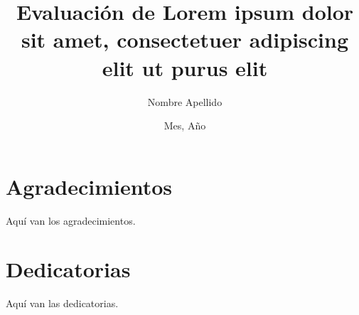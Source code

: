 \documentclass{plantillaucsd}
\title{Evaluación de Lorem ipsum dolor sit amet, consectetuer adipiscing elit ut purus elit}
\author{Nombre Apellido} %
\date{Mes, Año} %
\begin{document}
\titlepage{}

\chapter*{Agradecimientos}
\thispagestyle{empty}
Aquí van los agradecimientos.
\newpage
\chapter*{Dedicatorias}
Aquí van las dedicatorias.
\thispagestyle{empty}
\newpage


\tableofcontents{}
\thispagestyle{empty}
\newpage







\nocite{*}

\printbibliography[heading=bibintoc]
\end{document}
